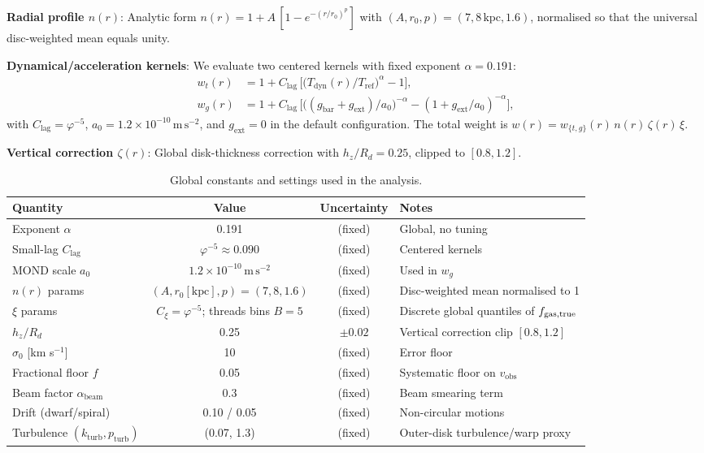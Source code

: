 \documentclass[fleqn,usenatbib]{mnras}
\begin{document}
\textbf{Radial profile $n(r)$}: Analytic form $n(r) = 1 + A\,[1 - e^{-(r/r_0)^p}]$ with $(A, r_0, p) = (7, 8\,\mathrm{kpc}, 1.6)$, normalised so that the universal disc-weighted mean equals unity.

\textbf{Dynamical/acceleration kernels}: We evaluate two centered kernels with fixed exponent $\alpha = 0.191$:
\begin{align}
w_t(r) &= 1 + C_\mathrm{lag}\,\Big[\big(T_\mathrm{dyn}(r)/T_\mathrm{ref}\big)^{\alpha} - 1\Big],\\
w_g(r) &= 1 + C_\mathrm{lag}\,\Big[\big((g_\mathrm{bar}+g_\mathrm{ext})/a_0\big)^{-\alpha} - (1+g_\mathrm{ext}/a_0)^{-\alpha}\Big],
\end{align}
with $C_\mathrm{lag} = \varphi^{-5}$, $a_0 = 1.2\times10^{-10}\,\mathrm{m\,s^{-2}}$, and $g_\mathrm{ext}=0$ in the default configuration. The total weight is $w(r) = w_{\{t,g\}}(r)\, n(r)\,\zeta(r)\,\xi$.

\textbf{Vertical correction $\zeta(r)$}: Global disk-thickness correction with $h_z/R_d = 0.25$, clipped to $[0.8, 1.2]$.

\begin{table}[h]
\centering
\caption{Global constants and settings used in the analysis.}
\label{tab:parameters}
\begin{tabular}{l c c l}
\toprule
Quantity & Value & Uncertainty & Notes \\
\midrule
Exponent $\alpha$ & 0.191 & (fixed) & Global, no tuning \\
Small-lag $C_\mathrm{lag}$ & $\varphi^{-5} \approx 0.090$ & (fixed) & Centered kernels \\
MOND scale $a_0$ & $1.2\times10^{-10}\,\mathrm{m\,s^{-2}}$ & (fixed) & Used in $w_g$ \\
$n(r)$ params & $(A, r_0[\mathrm{kpc}], p)=(7,8,1.6)$ & (fixed) & Disc-weighted mean normalised to 1 \\
$\xi$ params & $C_\xi=\varphi^{-5}$; threads bins $B{=}5$ & (fixed) & Discrete global quantiles of $f_{\rm gas,true}$ \\
$h_z/R_d$ & 0.25 & $\pm 0.02$ & Vertical correction clip $[0.8,1.2]$ \\
$\sigma_0$ [km s$^{-1}$] & 10 & (fixed) & Error floor \\
Fractional floor $f$ & 0.05 & (fixed) & Systematic floor on $v_\mathrm{obs}$ \\
Beam factor $\alpha_\mathrm{beam}$ & 0.3 & (fixed) & Beam smearing term \\
Drift (dwarf/spiral) & 0.10 / 0.05 & (fixed) & Non-circular motions \\
Turbulence $(k_\mathrm{turb},p_\mathrm{turb})$ & (0.07, 1.3) & (fixed) & Outer-disk turbulence/warp proxy \\
\bottomrule
\end{tabular}
\end{table}
\end{document}
